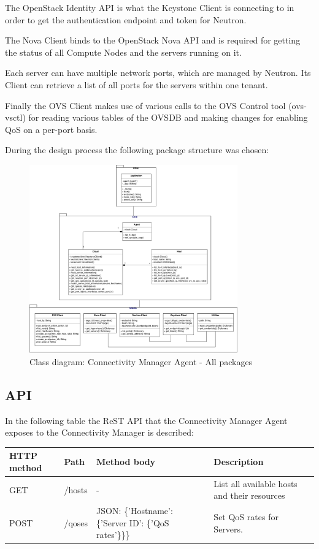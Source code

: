 The OpenStack Identity API is what the Keystone Client is connecting to in order to get the authentication endpoint and token for Neutron.

The Nova Client binds to the OpenStack Nova API and is required for getting the status of all Compute Nodes and the servers running on it.

Each server can have multiple network ports, which are managed by Neutron. Its Client can retrieve a list of all ports for the servers within one tenant.

Finally the OVS Client makes use of various calls to the OVS Control tool (ovs-vsctl) for reading various tables of the OVSDB and making changes for enabling QoS on a per-port basis.

During the design process the following package structure was chosen:

\begin{figure}[H]
\centering

\includegraphics[width=0.8\textwidth]{images/design/cm_agent_class_diagram}

\caption{Class diagram: Connectivity Manager Agent - All packages}
\end{figure}




\subsection{API}

In the following table the ReST API that the Connectivity Manager Agent exposes to the Connectivity Manager is described:

\begin{tabularx}{\textwidth}{ |X|X|X|X| }
\hline HTTP method & Path & Method body & Description \\ 
\hline GET & /hosts & - & List all available hosts and their resources \\ 
\hline POST & /qoses & JSON: \{'Hostname': \{'Server ID': \{'QoS rates'\}\}\} & Set QoS rates for Servers. \\ 
\hline 
\end{tabularx}


